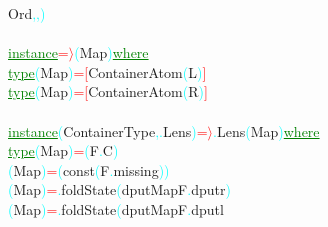 {\rm{}Ord}\textcolor{cyan}{,}\textcolor{cyan}{,}\textcolor{cyan}{)}\\\\\textcolor{green}{\underline{instance}}\hsspace \textcolor{red}{=\ensuremath{\rangle}}\hsspace \textcolor{cyan}{(}{\rm{}Map}\textcolor{cyan}{)}\hsspace \textcolor{green}{\underline{where}}\\\hstab \textcolor{green}{\underline{type}}\hsspace \textcolor{cyan}{(}{\rm{}Map}\textcolor{cyan}{)}\hsspace \textcolor{red}{=}\hsspace \textcolor{red}{[}{\rm{}ContainerAtom}\hsspace \textcolor{cyan}{(}{\rm{}L}\textcolor{cyan}{)}\textcolor{red}{]}\\\hstab \textcolor{green}{\underline{type}}\hsspace \textcolor{cyan}{(}{\rm{}Map}\textcolor{cyan}{)}\hsspace \textcolor{red}{=}\hsspace \textcolor{red}{[}{\rm{}ContainerAtom}\hsspace \textcolor{cyan}{(}{\rm{}R}\textcolor{cyan}{)}\textcolor{red}{]}\\\\\textcolor{green}{\underline{instance}}\hsspace \textcolor{cyan}{(}{\rm{}ContainerType}\textcolor{cyan}{,}\textcolor{cyan}{.}{\rm{}Lens}\textcolor{cyan}{)}\hsspace \textcolor{red}{=\ensuremath{\rangle}}\textcolor{cyan}{.}{\rm{}Lens}\hsspace \textcolor{cyan}{(}{\rm{}Map}\textcolor{cyan}{)}\hsspace \textcolor{green}{\underline{where}}\\\hstab \textcolor{green}{\underline{type}}\hsspace \textcolor{cyan}{(}{\rm{}Map}\textcolor{cyan}{)}\hsspace \textcolor{red}{=}\hsspace \textcolor{cyan}{(}{\rm{}F}\textcolor{cyan}{.}{\rm{}C}\textcolor{cyan}{)}\\\hsspace \textcolor{cyan}{(}{\rm{}Map}\textcolor{cyan}{)}\hsspace \textcolor{red}{=}\hsspace \textcolor{cyan}{(}{\rm{}const}\hsspace \textcolor{cyan}{(}{\rm{}F}\textcolor{cyan}{.}{\rm{}missing}\textcolor{cyan}{)}\textcolor{cyan}{)}\\\hsspace \textcolor{cyan}{(}{\rm{}Map}\textcolor{cyan}{)}\hsspace \textcolor{red}{=}\textcolor{cyan}{.}{\rm{}foldState}\hsspace \textcolor{cyan}{(}{\rm{}dputMapF}\textcolor{cyan}{.}{\rm{}dputr}\textcolor{cyan}{)}\\\hsspace \textcolor{cyan}{(}{\rm{}Map}\textcolor{cyan}{)}\hsspace \textcolor{red}{=}\textcolor{cyan}{.}{\rm{}foldState}\hsspace \textcolor{cyan}{(}{\rm{}dputMapF}\textcolor{cyan}{.}{\rm{}dputl}\hsspace 